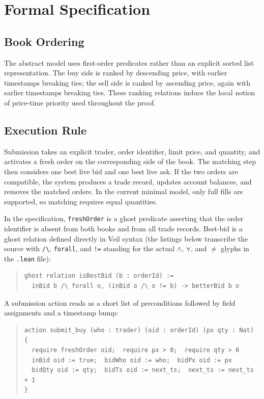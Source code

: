 \section{Formal Specification}

\subsection{Book Ordering}

The abstract model uses first-order predicates rather than an explicit sorted
list representation. The buy side is ranked by descending price, with earlier
timestamps breaking ties; the sell side is ranked by ascending price, again
with earlier timestamps breaking ties. These ranking relations induce the
local notion of price-time priority used throughout the proof.

\subsection{Execution Rule}

Submission takes an explicit trader, order identifier, limit price, and
quantity, and activates a fresh order on the corresponding side of the book.
The matching step then considers one best live bid and one best live ask. If
the two orders are compatible, the system produces a trade record, updates
account balances, and removes the matched orders. In the current minimal
model, only full fills are supported, so matching requires equal quantities.

In the specification, \texttt{freshOrder} is a ghost predicate asserting that
the order identifier is absent from both books and from all trade records.
Best-bid is a ghost relation defined directly in Veil syntax (the listings
below transcribe the source with \texttt{/\textbackslash}, \texttt{forall},
and \texttt{!=} standing for the actual \(\wedge\), \(\forall\), and
\(\neq\) glyphs in the \texttt{.lean} file):

\medskip
\begin{quote}
\begin{verbatim}
ghost relation isBestBid (b : orderId) :=
  inBid b /\ forall o, (inBid o /\ o != b) -> betterBid b o
\end{verbatim}
\end{quote}
\medskip

A submission action reads as a short list of preconditions followed by field
assignments and a timestamp bump:

\medskip
\begin{quote}
\begin{verbatim}
action submit_buy (who : trader) (oid : orderId) (px qty : Nat) {
  require freshOrder oid;  require px > 0;  require qty > 0
  inBid oid := true;  bidWho oid := who;  bidPx oid := px
  bidQty oid := qty;  bidTs oid := next_ts;  next_ts := next_ts + 1
}
\end{verbatim}
\end{quote}
\medskip

